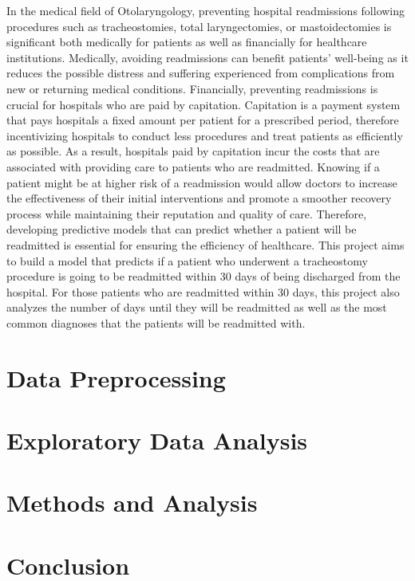 \documentclass[sn-basic,pdflatex]{sn-jnl}
\theoremstyle{remark}
\theoremstyle{definition}
\begin{document}
In the medical field of Otolaryngology, preventing hospital readmissions
following procedures such as tracheostomies, total laryngectomies, or
mastoidectomies is significant both medically for patients as well as
financially for healthcare institutions. Medically, avoiding
readmissions can benefit patients' well-being as it reduces the possible
distress and suffering experienced from complications from new or
returning medical conditions. Financially, preventing readmissions is
crucial for hospitals who are paid by capitation. Capitation is a
payment system that pays hospitals a fixed amount per patient for a
prescribed period, therefore incentivizing hospitals to conduct less
procedures and treat patients as efficiently as possible. As a result,
hospitals paid by capitation incur the costs that are associated with
providing care to patients who are readmitted. Knowing if a patient
might be at higher risk of a readmission would allow doctors to increase
the effectiveness of their initial interventions and promote a smoother
recovery process while maintaining their reputation and quality of care.
Therefore, developing predictive models that can predict whether a
patient will be readmitted is essential for ensuring the efficiency of
healthcare. \newline \newline This project aims to build a model that
predicts if a patient who underwent a tracheostomy procedure is going to
be readmitted within 30 days of being discharged from the hospital. For
those patients who are readmitted within 30 days, this project also
analyzes the number of days until they will be readmitted as well as the
most common diagnoses that the patients will be readmitted with.

\hypertarget{sec2}{%
\section{Data Preprocessing}\label{sec2}}

\hypertarget{sec3}{%
\section{Exploratory Data Analysis}\label{sec3}}

\hypertarget{sec4}{%
\section{Methods and Analysis}\label{sec4}}

\hypertarget{sec5}{%
\section{Conclusion}\label{sec5}}
\end{document}
